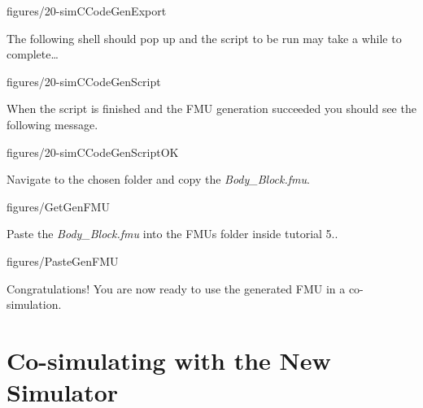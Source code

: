 \documentclass[11pt,a4paper]{../tutorial}
\begin{document}
\begin{instructions}
   \begin{annotation}[width=0.5\linewidth]{figures/20-simCCodeGenExport}
   \end{annotation}

\newpage

\item The following shell should pop up and the script to be run may take a while to complete\ldots

   \begin{annotation}[width=0.8\linewidth]{figures/20-simCCodeGenScript}
   \end{annotation}

\item When the script is finished and the FMU generation succeeded you should see the following message.

   \begin{annotation}[width=0.8\linewidth]{figures/20-simCCodeGenScriptOK}
   \end{annotation}

\item Navigate to the chosen folder and copy the \emph{Body\_Block.fmu}.

   \begin{annotation}[width=0.8\linewidth]{figures/GetGenFMU}
   \end{annotation}

\item \label{step:exp2}  Paste the \emph{Body\_Block.fmu} into the FMUs folder inside tutorial 5..

   \begin{annotation}[width=0.8\linewidth]{figures/PasteGenFMU}
   \end{annotation}

Congratulations! You are now ready to use the generated FMU in a co-simulation. 
\end{instructions}


\newpage

\section{Co-simulating with the New Simulator}
\label{sec:cosim}
\end{document}
